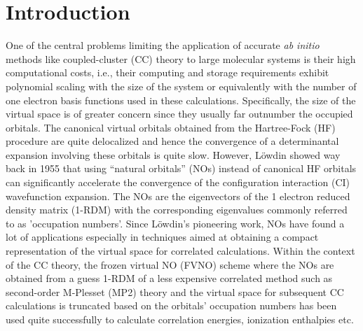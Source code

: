
\section{Introduction}

One of the central problems limiting the application of accurate {\em ab
initio} methods like coupled-cluster (CC) theory to large molecular systems is their high 
computational costs, i.e., their computing and storage requirements 
exhibit polynomial scaling with the size of the system or equivalently
with the number of one electron basis functions used in these calculations.
Specifically, the size of the virtual space is of greater concern since  
they usually far outnumber the occupied orbitals. The canonical virtual orbitals
obtained from the Hartree-Fock (HF) procedure are quite delocalized and hence 
the convergence of a determinantal expansion involving these orbitals
is quite slow. However, L{\"o}wdin showed way back in 1955 that using 
``natural orbitals'' (NOs) instead of canonical HF orbitals can significantly 
accelerate the convergence of the configuration interaction (CI)
wavefunction expansion. The NOs are the eigenvectors of the 
1 electron reduced density matrix (1-RDM) with the corresponding eigenvalues
commonly referred to as 'occupation numbers'. Since L{\"o}wdin's pioneering 
work, NOs have found a lot of applications especially in techniques 
aimed at obtaining a compact representation of the virtual space for 
correlated calculations.\cite{} Within the context of the CC theory,
the frozen virtual NO (FVNO) scheme where the NOs are obtained from 
a guess 1-RDM of a less expensive correlated method such as second-order 
M\oller-Plesset (MP2) theory and the virtual space for subsequent 
CC calculations is truncated based on the orbitals' occupation 
numbers has been used quite successfully to calculate correlation energies, 
ionization enthalpies etc.


